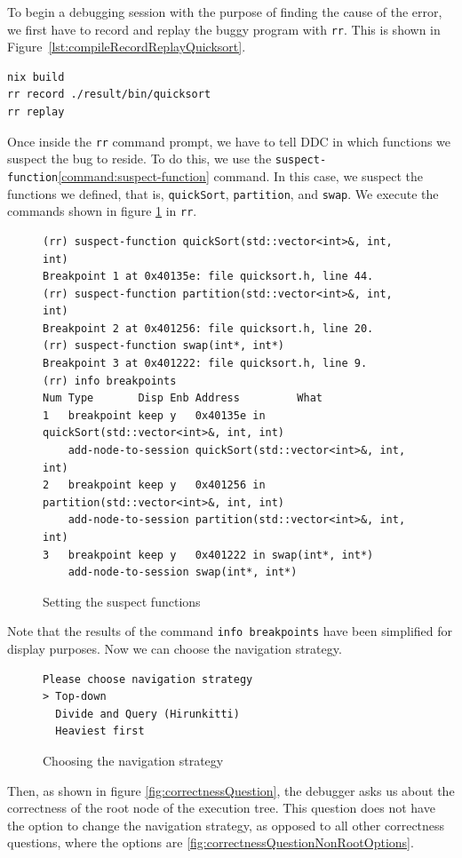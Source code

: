 To begin a debugging session with the purpose of finding the cause of the error, we first have to record and replay the buggy program with \verb|rr|. This is shown in 
Figure~\ref{lst:compileRecordReplayQuicksort}.
\begin{lstlisting}[language=bash, caption={Compiling, recording and replaying quickSort}, frame=tb, label={lst:compileRecordReplayQuicksort}]
nix build
rr record ./result/bin/quicksort
rr replay
\end{lstlisting}
Once inside the \verb|rr| command prompt, we have to tell DDC in which functions we suspect the bug to reside.
To do this, we use the \verb|suspect-function|\ref{command:suspect-function} command. In this case, we suspect the functions we defined, that is, \verb|quickSort|, \verb|partition|, and \verb|swap|. We execute the commands shown in figure \ref{fig:suspecting-functions} in \verb|rr|.
\begin{figure}[h]
    \centering
    \caption{Setting the suspect functions}
    \label{fig:suspecting-functions}
    \begin{verbatim}
(rr) suspect-function quickSort(std::vector<int>&, int, int)
Breakpoint 1 at 0x40135e: file quicksort.h, line 44.
(rr) suspect-function partition(std::vector<int>&, int, int) 
Breakpoint 2 at 0x401256: file quicksort.h, line 20.
(rr) suspect-function swap(int*, int*) 
Breakpoint 3 at 0x401222: file quicksort.h, line 9.
(rr) info breakpoints
Num Type       Disp Enb Address         What
1   breakpoint keep y   0x40135e in quickSort(std::vector<int>&, int, int)
    add-node-to-session quickSort(std::vector<int>&, int, int)
2   breakpoint keep y   0x401256 in partition(std::vector<int>&, int, int)
    add-node-to-session partition(std::vector<int>&, int, int)
3   breakpoint keep y   0x401222 in swap(int*, int*)
    add-node-to-session swap(int*, int*)
    \end{verbatim}
\end{figure}
Note that the results of the command \verb|info breakpoints| have been simplified for display purposes.
Now we can choose the navigation strategy.
\begin{figure}[h]
    \centering
    \caption{Choosing the navigation strategy}
    \label{fig:navigationsStrategyPrompt}
    \begin{verbatim}
Please choose navigation strategy
> Top-down                                                                                                                                            
  Divide and Query (Hirunkitti)                                                                                                                       
  Heaviest first
    \end{verbatim}
\end{figure}
Then, as shown in figure \ref{fig:correctnessQuestion}, the debugger asks us about the correctness of the root node of the execution tree. This question does not have the option to change the navigation strategy, as opposed to all other correctness questions, where the options are \ref{fig:correctnessQuestionNonRootOptions}. 

